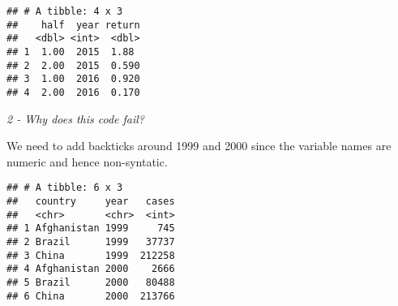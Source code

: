 \documentclass[]{article}
\newenvironment{Shaded}{\begin{snugshade}}{\end{snugshade}}
\newcommand{\KeywordTok}[1]{\textcolor[rgb]{0.13,0.29,0.53}{\textbf{#1}}}
\newcommand{\DataTypeTok}[1]{\textcolor[rgb]{0.13,0.29,0.53}{#1}}
\newcommand{\DecValTok}[1]{\textcolor[rgb]{0.00,0.00,0.81}{#1}}
\newcommand{\StringTok}[1]{\textcolor[rgb]{0.31,0.60,0.02}{#1}}
\newcommand{\CommentTok}[1]{\textcolor[rgb]{0.56,0.35,0.01}{\textit{#1}}}
\newcommand{\OtherTok}[1]{\textcolor[rgb]{0.56,0.35,0.01}{#1}}
\newcommand{\OperatorTok}[1]{\textcolor[rgb]{0.81,0.36,0.00}{\textbf{#1}}}
\newcommand{\NormalTok}[1]{#1}
\theoremstyle{definition}
\theoremstyle{definition}
\theoremstyle{definition}
\theoremstyle{remark}
\begin{document}
\begin{Shaded}
\end{Shaded}

\begin{verbatim}
## # A tibble: 4 x 3
##    half  year return
##   <dbl> <int>  <dbl>
## 1  1.00  2015  1.88 
## 2  2.00  2015  0.590
## 3  1.00  2016  0.920
## 4  2.00  2016  0.170
\end{verbatim}

\emph{2 - Why does this code fail?}

\begin{Shaded}
\end{Shaded}

We need to add backticks around 1999 and 2000 since the variable names
are numeric and hence non-syntatic.

\begin{Shaded}
\end{Shaded}

\begin{verbatim}
## # A tibble: 6 x 3
##   country     year   cases
##   <chr>       <chr>  <int>
## 1 Afghanistan 1999     745
## 2 Brazil      1999   37737
## 3 China       1999  212258
## 4 Afghanistan 2000    2666
## 5 Brazil      2000   80488
## 6 China       2000  213766
\end{verbatim}
\end{document}
